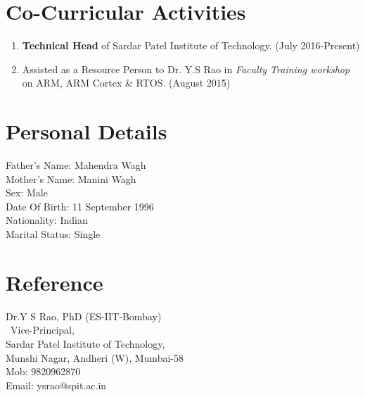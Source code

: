 \documentclass[10pt,a4paper,sans]{moderncv} %
\begin{document}
\section{Co-Curricular Activities}
\begin{enumerate}
\item \textbf{Technical Head} of Sardar Patel Institute of Technology.                           (July 2016-Present) 
\item Assisted as a Resource Person to Dr. Y.S Rao in \textit{Faculty Training workshop} on ARM, ARM Cortex \& RTOS.    (August 2015)  

\end{enumerate}




\section{Personal Details}
Father's Name: Mahendra Wagh \\
Mother's Name: Manini Wagh \\
Sex: Male \\
Date Of Birth: 11 September 1996 \\
Nationality: Indian\\
Marital Status: Single




\section{Reference}
Dr.Y S Rao, PhD (ES-IIT-Bombay)    \\                                                                                    \
Vice-Principal,      \\                                                        
Sardar Patel Institute of Technology,       \\                  
Munshi Nagar, Andheri (W), Mumbai-58     \\    
Mob: 9820962870 \\                                                                      
Email: ysrao@spit.ac.in   \\
\end{document}

